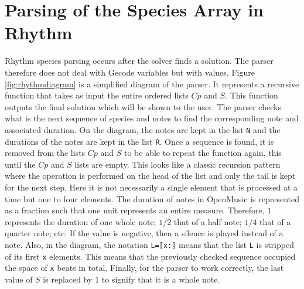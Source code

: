 \section{Parsing of the Species Array in Rhythm}
Rhythm species parsing occurs after the solver finds a solution. The parser therefore does not deal with Gecode variables but with values. Figure \ref{fig:rhythmdiagram} is a simplified diagram of the parser. It represents a recursive function that takes as input the entire ordered lists $Cp$ and $S$. This function outputs the final solution which will be shown to the user. The parser checks what is the next sequence of species and notes to find the corresponding note and associated duration. On the diagram, the notes are kept in the list \texttt{N} and the durations of the notes are kept in the list \texttt{R}. Once a sequence is found, it is removed from the lists $Cp$ and $S$ to be able to repeat the function again, this until the $Cp$ and $S$ lists are empty. This looks like a classic recursion pattern where the operation is performed on the head of the list and only the tail is kept for the next step. Here it is not necessarily a single element that is processed at a time but one to four elements. 
\newpage
The duration of notes in OpenMusic is represented as a fraction such that one unit represents an entire measure. Therefore, $1$ represents the duration of one whole note; $1/2$ that of a half note; $1/4$ that of a quarter note; etc. If the value is negative, then a silence is played instead of a note. Also, in the diagram, the notation \texttt{L=[x:]} means that the list \texttt{L} is stripped of its first \texttt{x} elements. This means that the previously checked sequence occupied the space of \texttt{x} beats in total. Finally, for the parser to work correctly, the last value of $S$ is replaced by $1$ to signify that it is a whole note.

